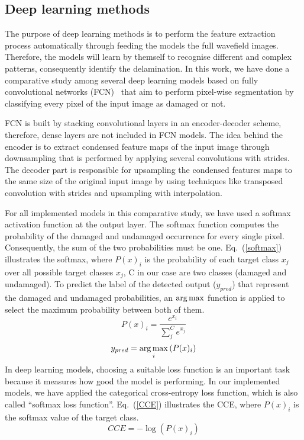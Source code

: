 \subsection{Deep learning methods}
The purpose of deep learning methods is to perform the feature extraction process automatically through feeding the models the full wavefield images.
Therefore, the models will learn by themself to recognise different and complex patterns, consequently identify the delamination. 
In this work, we have done a comparative study among several deep learning models based on fully convolutional networks (FCN)~\cite{shelhamer2017fully} that aim to perform pixel-wise segmentation by classifying every pixel of the input image as damaged or not. 

FCN is built by stacking convolutional layers in an encoder-decoder scheme, therefore, dense layers are not included in FCN models. 
The idea behind the encoder is to extract condensed feature maps of the input image through downsampling that is performed by applying several convolutions with strides.
The decoder part is responsible for upsampling the condensed features maps to the same size of the original input image by using techniques like transposed convolution with strides and upsampling with interpolation.


For all implemented models in this comparative study, we have used a softmax activation function at the output layer.
The softmax function computes the probability of the damaged and undamaged occurrence for every single pixel.
Consequently, the sum of the two probabilities must be one. 
Eq.~(\ref{softmax}) illustrates the softmax, where \(P(x)_{i}\) is the probability of each target class \(x_{j}\) over all possible target classes \(x_{j}\), C in our case are two classes  (damaged and undamaged).
To predict the label of the detected output (\(y_{pred}\)) that represent the damaged and undamaged probabilities, an \(\operatorname*{arg\,max}\) function is applied to select the maximum probability between both of them.
	\begin{equation}
		P(x)_{i} = \frac{e^{x_{i}}}{\sum_{j}^{C} e^{x_{j}}}
		\label{softmax}
	\end{equation} 
	\begin{equation}
		y_{pred} = \operatorname*{arg\,max}_{i}\left( P(x)_{i} \right)
		\label{argmax}
	\end{equation}
In deep learning models, choosing a suitable loss function is an important task because it measures how good the model is performing.
In our implemented models, we have applied the categorical cross-entropy loss function, which is also called \enquote{softmax loss function}.
Eq.~(\ref{CCE}) illustrates the CCE, where \( P(x)_{i}\) is the softmax value of the target class. 
	\begin{equation}
	CCE = -\log\left( P(x)_{i} \right)
	\label{CCE}
	\end{equation}

